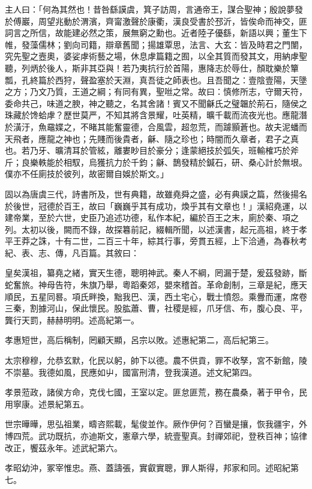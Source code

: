 \begin{pinyinscope}
主人曰：「何為其然也！昔咎繇謨虞，箕子訪周，言通帝王，謀合聖神；殷說夢發於傅巖，周望兆動於渭濱，齊甯激聲於康衢，漢良受書於邳沂，皆俟命而神交，匪詞言之所信，故能建必然之策，展無窮之勳也。近者陸子優繇，新語以興；董生下帷，發藻儒林；劉向司籍，辯章舊聞；揚雄覃思，法言、大玄：皆及時君之門闈，究先聖之壼奧，婆娑虖術藝之場，休息虖篇籍之囿，以全其質而發其文，用納虖聖聽，列炳於後人，斯非其亞與！若乃夷抗行於首陽，惠降志於辱仕，顏耽樂於簞瓢，孔終篇於西狩，聲盈塞於天淵，真吾徒之師表也。且吾聞之：壹陰壹陽，天墬之方；乃文乃質，王道之綱；有同有異，聖咝之常。故曰：慎修所志，守爾天符，委命共己，味道之腴，神之聽之，名其舍諸！賓又不聞龢氏之璧韞於荊石，隨侯之珠藏於馋蛤虖？歷世莫严，不知其將含景耀，吐英精，曠千載而流夜光也。應龍潛於潢汙，魚黿媟之，不睹其能奮靈德，合風雲，超忽荒，而躆顥蒼也。故夫泥蟠而天飛者，應龍之神也；先賤而後貴者，龢、隨之珍也；時闇而久章者，君子之真也。若乃牙、曠清耳於管絃，離婁眇目於豪分；逢蒙絕技於弧矢，班輸榷巧於斧斤；良樂軼能於相馭，烏獲抗力於千鈞；龢、鵲發精於鍼石，研、桑心計於無垠。僕亦不任廁技於彼列，故密爾自娛於斯文。」

固以為唐虞三代，詩書所及，世有典籍，故雖堯舜之盛，必有典謨之篇，然後揚名於後世，冠德於百王，故曰「巍巍乎其有成功，煥乎其有文章也！」漢紹堯運，以建帝業，至於六世，史臣乃追述功德，私作本紀，編於百王之末，廁於秦、項之列。太初以後，闕而不錄，故探篹前記，綴輯所聞，以述漢書，起元高祖，終于孝平王莽之誅，十有二世，二百三十年，綜其行事，旁貫五經，上下洽通，為春秋考紀、表、志、傳，凡百篇。其敘曰：

皇矣漢祖，纂堯之緒，實天生德，聰明神武。秦人不綱，罔漏于楚，爰茲發跡，斷蛇奮旅。神母告符，朱旗乃舉，粵蹈秦郊，嬰來稽首。革命創制，三章是紀，應天順民，五星同晷。項氏畔換，黜我巴、漢，西土宅心，戰士憤怨。乘釁而運，席卷三秦，割據河山，保此懷民。股肱蕭、曹，社稷是經，爪牙信、布，腹心良、平，龔行天罰，赫赫明明。述高紀第一。

孝惠短世，高后稱制，罔顧天顯，呂宗以敗。述惠紀第二，高后紀第三。

太宗穆穆，允恭玄默，化民以躬，帥下以德。農不供貢，罪不收孥，宮不新館，陵不崇墓。我德如風，民應如屮，國富刑清，登我漢道。述文紀第四。

孝景蒞政，諸侯方命，克伐七國，王室以定。匪怠匪荒，務在農桑，著于甲令，民用寧康。述景紀第五。

世宗曄曄，思弘祖業，疇咨熙載，髦俊並作。厥作伊何？百蠻是攘，恢我疆宇，外博四荒。武功既抗，亦迪斯文，憲章六學，統壹聖真。封禪郊祀，登秩百神；協律改正，饗茲永年。述武紀第六。

孝昭幼沖，冢宰惟忠。燕、蓋譸張，實叡實聰，罪人斯得，邦家和同。述昭紀第七。


\end{pinyinscope}
